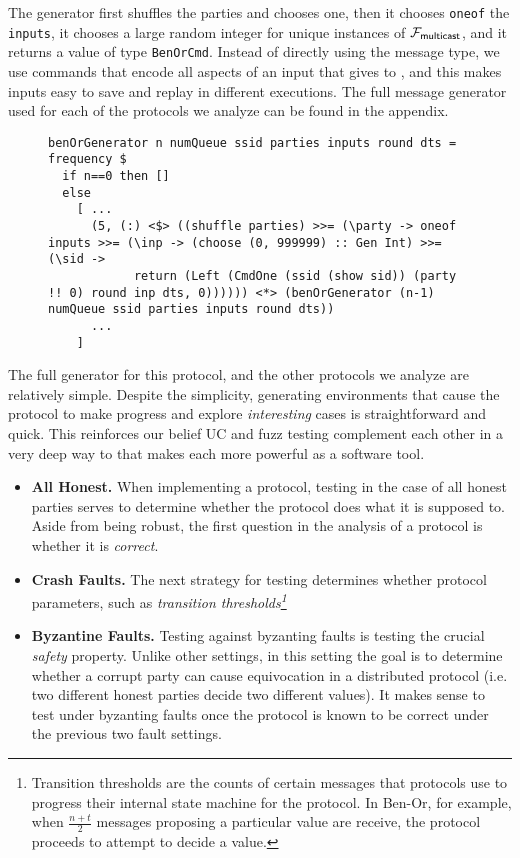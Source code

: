 The generator first shuffles the parties and chooses one, then it chooses \texttt{oneof} the \texttt{inputs}, it chooses a large random integer for unique instances of $\mathcal{F}_{{\mathsf {multicast}}}$, and it returns a value of type \texttt{BenOrCmd}.
Instead of directly using the message type, we use commands that encode all aspects of an input that \Z gives to \A, and this makes inputs easy to save and replay in different executions.
The full message generator used for each of the protocols we analyze can be found in the appendix.
\begin{figure*}
\begin{lstlisting}
benOrGenerator n numQueue ssid parties inputs round dts = frequency $
  if n==0 then []
  else  
 	[ ...
      (5, (:) <$> ((shuffle parties) >>= (\party -> oneof inputs >>= (\inp -> (choose (0, 999999) :: Gen Int) >>= (\sid -> 
            return (Left (CmdOne (ssid (show sid)) (party !! 0) round inp dts, 0)))))) <*> (benOrGenerator (n-1) numQueue ssid parties inputs round dts))
      ...
    ]
\end{lstlisting}
\end{figure*}
The full generator for this protocol, and the other protocols we analyze are relatively simple. 
Despite the simplicity, generating environments that cause the protocol to make progress and explore \emph{interesting} cases is straightforward and quick.
This reinforces our belief UC and fuzz testing complement each other in a very deep way to that makes each more powerful as a software tool. 

\begin{itemize}
  \item \textbf{All Honest.} When implementing a protocol, testing in the case of all honest parties serves to determine whether the protocol does what it is supposed to. Aside from being robust, the first question in the analysis of a protocol is whether it is \emph{correct}.
  \item \textbf{Crash Faults.} The next strategy for testing determines whether protocol parameters, such as \emph{transition thresholds\footnote{Transition thresholds are the counts of certain messages that protocols use to progress their internal state machine for the protocol. In Ben-Or, for example, when $\frac{n+t}{2}$ messages proposing a particular value are receive, the protocol proceeds to attempt to decide a value.}}
  \item \textbf{Byzantine Faults.} Testing against byzanting faults is testing the crucial \emph{safety} property. Unlike other settings, in this setting the goal is to determine whether a corrupt party can cause equivocation in a distributed protocol (i.e. two different honest parties decide two different values). It makes sense to test under byzanting faults once the protocol is known to be correct under the previous two fault settings. 
\end{itemize}

